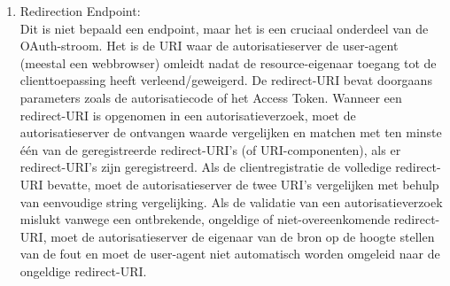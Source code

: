 \begin{enumerate}[label=\textbf{-}]
    \item Redirection Endpoint: \\
    Dit is niet bepaald een endpoint, maar het is een cruciaal onderdeel van de OAuth-stroom. Het is de URI waar de autorisatieserver de user-agent (meestal een webbrowser) omleidt nadat de resource-eigenaar toegang tot de clienttoepassing heeft verleend/geweigerd. De redirect-URI bevat doorgaans parameters zoals de autorisatiecode of het Access Token. Wanneer een redirect-URI is opgenomen in een autorisatieverzoek, moet de autorisatieserver de ontvangen waarde vergelijken en matchen met ten minste één van de geregistreerde redirect-URI's (of URI-componenten), als er redirect-URI's zijn geregistreerd. Als de clientregistratie de volledige redirect-URI bevatte, moet de autorisatieserver de twee URI's vergelijken met behulp van eenvoudige string vergelijking. Als de validatie van een autorisatieverzoek mislukt vanwege een ontbrekende, ongeldige of niet-overeenkomende redirect-URI, moet de autorisatieserver de eigenaar van de bron op de hoogte stellen van de fout en moet de user-agent niet automatisch worden omgeleid naar de ongeldige redirect-URI.
  \end{enumerate}

